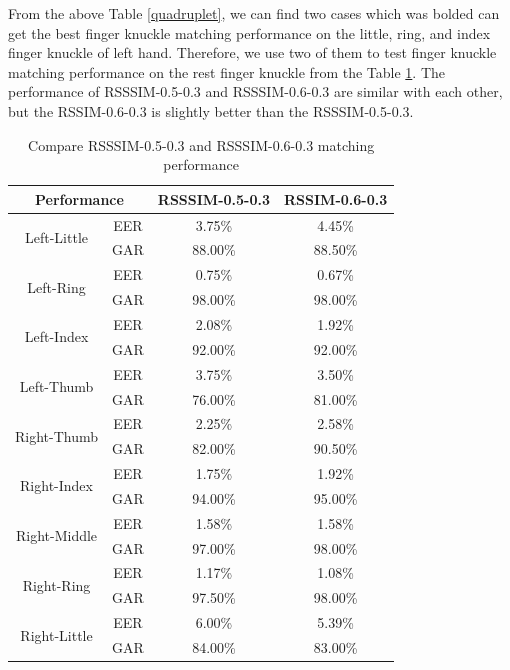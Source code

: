 From the above Table \ref{quadruplet}, we  can find two cases which was bolded can get the best finger knuckle matching performance on the little, ring, and index finger knuckle of left hand. Therefore, we use two of them to test finger knuckle matching performance on the rest finger knuckle from the Table \ref{quadruplet-best}. The performance of RSSSIM-0.5-0.3 and RSSSIM-0.6-0.3 are similar with each other, but the RSSIM-0.6-0.3 is slightly better than the RSSSIM-0.5-0.3.


\begin{table}[ht]
    \centering
    \caption{Compare RSSSIM-0.5-0.3 and RSSSIM-0.6-0.3 matching performance}
    \begin{tabular}{cccc}
    \hline
    \multicolumn{2}{c}{Performance}     & RSSSIM-0.5-0.3 & RSSIM-0.6-0.3 \\ \hline
    \multirow{2}{*}{Left-Little}  & EER & 3.75\%         & 4.45\%        \\
                                  & GAR & 88.00\%        & 88.50\%       \\ \hline
    \multirow{2}{*}{Left-Ring}    & EER & 0.75\%         & 0.67\%        \\
                                  & GAR & 98.00\%        & 98.00\%       \\ \hline
    \multirow{2}{*}{Left-Index}   & EER & 2.08\%         & 1.92\%        \\
                                  & GAR & 92.00\%        & 92.00\%       \\ \hline
    \multirow{2}{*}{Left-Thumb}   & EER & 3.75\%         & 3.50\%        \\
                                  & GAR & 76.00\%        & 81.00\%       \\ \hline
    \multirow{2}{*}{Right-Thumb}  & EER & 2.25\%         & 2.58\%        \\
                                  & GAR & 82.00\%        & 90.50\%       \\ \hline
    \multirow{2}{*}{Right-Index}  & EER & 1.75\%         & 1.92\%        \\
                                  & GAR & 94.00\%        & 95.00\%       \\ \hline
    \multirow{2}{*}{Right-Middle} & EER & 1.58\%         & 1.58\%        \\
                                  & GAR & 97.00\%        & 98.00\%       \\ \hline
    \multirow{2}{*}{Right-Ring}   & EER & 1.17\%         & 1.08\%        \\
                                  & GAR & 97.50\%        & 98.00\%       \\ \hline
    \multirow{2}{*}{Right-Little} & EER & 6.00\%         & 5.39\%        \\
                                  & GAR & 84.00\%        & 83.00\%       \\ \hline
    \end{tabular}
    \label{quadruplet-best}
\end{table}



